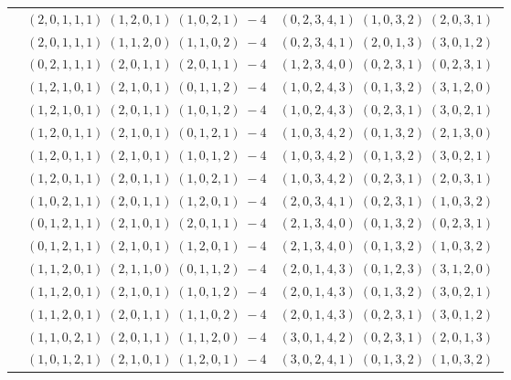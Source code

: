 \documentclass[11pt]{article}
\begin{document}
\begin{longtable}[l]{|c|c|c|}
 \cline{2-3} 
 & $(2 ,0 ,1 ,1 ,1) \;(1 ,2 ,0 ,1) \;(1 ,0 ,2 ,1) \;-4$ & $(0 ,2 ,3 ,4 ,1) \;(1 ,0 ,3 ,2) \;(2 ,0 ,3 ,1) \;$\\ 
 \cline{2-3} 
 & $(2 ,0 ,1 ,1 ,1) \;(1 ,1 ,2 ,0) \;(1 ,1 ,0 ,2) \;-4$ & $(0 ,2 ,3 ,4 ,1) \;(2 ,0 ,1 ,3) \;(3 ,0 ,1 ,2) \;$\\ 
 \cline{2-3} 
 & $(0 ,2 ,1 ,1 ,1) \;(2 ,0 ,1 ,1) \;(2 ,0 ,1 ,1) \;-4$ & $(1 ,2 ,3 ,4 ,0) \;(0 ,2 ,3 ,1) \;(0 ,2 ,3 ,1) \;$\\ 
 \cline{2-3} 
 & $(1 ,2 ,1 ,0 ,1) \;(2 ,1 ,0 ,1) \;(0 ,1 ,1 ,2) \;-4$ & $(1 ,0 ,2 ,4 ,3) \;(0 ,1 ,3 ,2) \;(3 ,1 ,2 ,0) \;$\\ 
 \cline{2-3} 
 & $(1 ,2 ,1 ,0 ,1) \;(2 ,0 ,1 ,1) \;(1 ,0 ,1 ,2) \;-4$ & $(1 ,0 ,2 ,4 ,3) \;(0 ,2 ,3 ,1) \;(3 ,0 ,2 ,1) \;$\\ 
 \cline{2-3} 
 & $(1 ,2 ,0 ,1 ,1) \;(2 ,1 ,0 ,1) \;(0 ,1 ,2 ,1) \;-4$ & $(1 ,0 ,3 ,4 ,2) \;(0 ,1 ,3 ,2) \;(2 ,1 ,3 ,0) \;$\\ 
 \cline{2-3} 
 & $(1 ,2 ,0 ,1 ,1) \;(2 ,1 ,0 ,1) \;(1 ,0 ,1 ,2) \;-4$ & $(1 ,0 ,3 ,4 ,2) \;(0 ,1 ,3 ,2) \;(3 ,0 ,2 ,1) \;$\\ 
 \cline{2-3} 
 & $(1 ,2 ,0 ,1 ,1) \;(2 ,0 ,1 ,1) \;(1 ,0 ,2 ,1) \;-4$ & $(1 ,0 ,3 ,4 ,2) \;(0 ,2 ,3 ,1) \;(2 ,0 ,3 ,1) \;$\\ 
 \cline{2-3} 
 & $(1 ,0 ,2 ,1 ,1) \;(2 ,0 ,1 ,1) \;(1 ,2 ,0 ,1) \;-4$ & $(2 ,0 ,3 ,4 ,1) \;(0 ,2 ,3 ,1) \;(1 ,0 ,3 ,2) \;$\\ 
 \cline{2-3} 
 & $(0 ,1 ,2 ,1 ,1) \;(2 ,1 ,0 ,1) \;(2 ,0 ,1 ,1) \;-4$ & $(2 ,1 ,3 ,4 ,0) \;(0 ,1 ,3 ,2) \;(0 ,2 ,3 ,1) \;$\\ 
 \cline{2-3} 
 & $(0 ,1 ,2 ,1 ,1) \;(2 ,1 ,0 ,1) \;(1 ,2 ,0 ,1) \;-4$ & $(2 ,1 ,3 ,4 ,0) \;(0 ,1 ,3 ,2) \;(1 ,0 ,3 ,2) \;$\\ 
 \cline{2-3} 
 & $(1 ,1 ,2 ,0 ,1) \;(2 ,1 ,1 ,0) \;(0 ,1 ,1 ,2) \;-4$ & $(2 ,0 ,1 ,4 ,3) \;(0 ,1 ,2 ,3) \;(3 ,1 ,2 ,0) \;$\\ 
 \cline{2-3} 
 & $(1 ,1 ,2 ,0 ,1) \;(2 ,1 ,0 ,1) \;(1 ,0 ,1 ,2) \;-4$ & $(2 ,0 ,1 ,4 ,3) \;(0 ,1 ,3 ,2) \;(3 ,0 ,2 ,1) \;$\\ 
 \cline{2-3} 
 & $(1 ,1 ,2 ,0 ,1) \;(2 ,0 ,1 ,1) \;(1 ,1 ,0 ,2) \;-4$ & $(2 ,0 ,1 ,4 ,3) \;(0 ,2 ,3 ,1) \;(3 ,0 ,1 ,2) \;$\\ 
 \cline{2-3} 
 & $(1 ,1 ,0 ,2 ,1) \;(2 ,0 ,1 ,1) \;(1 ,1 ,2 ,0) \;-4$ & $(3 ,0 ,1 ,4 ,2) \;(0 ,2 ,3 ,1) \;(2 ,0 ,1 ,3) \;$\\ 
 \cline{2-3} 
 & $(1 ,0 ,1 ,2 ,1) \;(2 ,1 ,0 ,1) \;(1 ,2 ,0 ,1) \;-4$ & $(3 ,0 ,2 ,4 ,1) \;(0 ,1 ,3 ,2) \;(1 ,0 ,3 ,2) \;$\\ 

\end{longtable}
\end{document}
